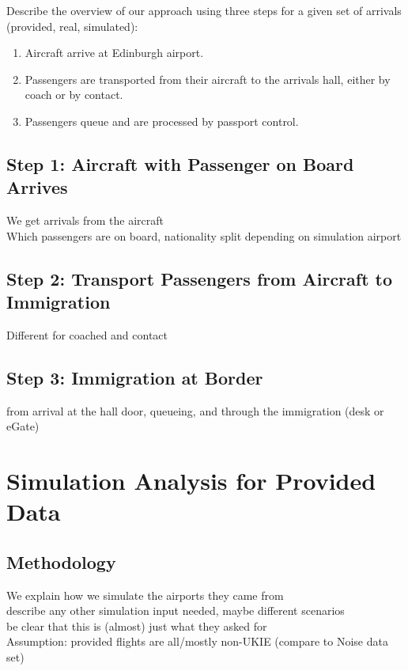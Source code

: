 \documentclass[10pt]{article}
\begin{document}
Describe the overview of our approach using three steps for a given set of arrivals (provided, real, simulated):

\begin{enumerate}
    \item Aircraft arrive at Edinburgh airport. \label{step:aircraft}
    \item Passengers are transported from their aircraft to the arrivals hall, either by coach or by contact. \label{step:route}
    \item Passengers queue and are processed by passport control. \label{step:immigration}
\end{enumerate}

\subsection{Step 1: Aircraft with Passenger on Board Arrives}
We get arrivals from the aircraft  \\
Which passengers are on board, nationality split depending on simulation airport

\subsection{Step 2: Transport Passengers from Aircraft to Immigration}
Different for coached and contact

\subsection{Step 3: Immigration at Border}
from arrival at the hall door, queueing, and through the immigration (desk or eGate)



\section{Simulation Analysis for Provided Data}

\subsection{Methodology}
We explain how we simulate the airports they came from \\
describe any other simulation input needed, maybe different scenarios \\ 
be clear that this is (almost) just what they asked for  \\ Assumption: provided flights are all/mostly non-UKIE (compare to Noise data set)
\end{document}
